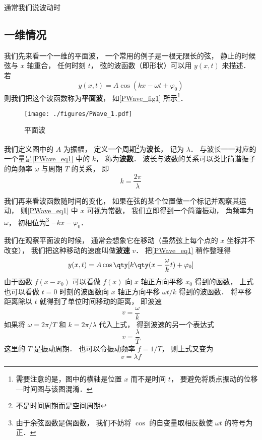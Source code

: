 

通常我们说波动时

\subsection{一维情况}
我们先来看一个一维的平面波， 一个常用的例子是一根无限长的弦， 静止的时候弦与 $x$ 轴重合， 任何时刻 $t$， 弦的波函数（即形状）可以用 $y(x, t)$ 来描述． 若
\begin{equation}\label{PWave_eq1}
y(x, t) = A\cos(k x - \omega t + \varphi_0)
\end{equation}
则我们把这个波函数称为\textbf{平面波}， 如\autoref{PWave_fig1} 所示\footnote{需要注意的是，图中的横轴是位置 $x$ 而不是时间 $t$， 要避免将质点振动的位移—时间图与该图混淆．}．

\begin{figure}[ht]
\centering
\texttt{[image: ./figures/PWave\_1.pdf]}
\caption{平面波} \label{PWave_fig1}
\end{figure}

我们定义图中的 $A$ 为振幅， 定义一个周期\footnote{不是时间周期而是空间周期}为\textbf{波长}， 记为 $\lambda$． 与波长一一对应的一个量是\autoref{PWave_eq1} 中的 $k$， 称为\textbf{波数}． 波长与波数的关系可以类比简谐振子 的角频率 $\omega$ 与周期 $T$ 的关系， 即
\begin{equation}
k = \frac{2\pi}{\lambda}
\end{equation}

我们再来看波函数随时间的变化， 如果在弦的某个位置做一个标记并观察其运动， 则\autoref{PWave_eq1} 中 $x$ 可视为常数， 我们立即得到一个简谐振动， 角频率为 $\omega$， 初相位为\footnote{由于余弦函数是偶函数， 我们不妨将 $\cos$ 的自变量取相反数使 $\omega t$ 的符号为正．} $-kx - \varphi_0$．

我们在观察平面波的时候， 通常会想象它在移动（虽然弦上每个点的 $x$ 坐标并不改变）， 我们把这种移动的速度叫做\textbf{波速} $v$． 把\autoref{PWave_eq1} 稍作整理得
\begin{equation}
y(x, t) = A\cos \qty[k \qty(x - \frac{\omega}{k} t) + \varphi_0]
\end{equation}
由于函数 $f(x - x_0)$ 可以看做 $f(x)$ 向 $x$ 轴正方向平移 $x_0$ 得到的函数， 上式也可以看做 $t = 0$ 时刻的波函数向 $x$ 轴正方向平移 $\omega t/k$ 得到的波函数． 将平移距离除以 $t$ 就得到了单位时间移动的距离， 即波速
\begin{equation}
v = \frac{\omega}{k}
\end{equation}
如果将 $\omega = 2\pi/T$ 和 $k = 2\pi/\lambda$ 代入上式， 得到波速的另一个表达式
\begin{equation}
v = \frac{\lambda}{T}
\end{equation}
这里的 $T$ 是振动周期． 也可以令振动频率 $f = 1/T$， 则上式又变为
\begin{equation}
v = \lambda f
\end{equation}


